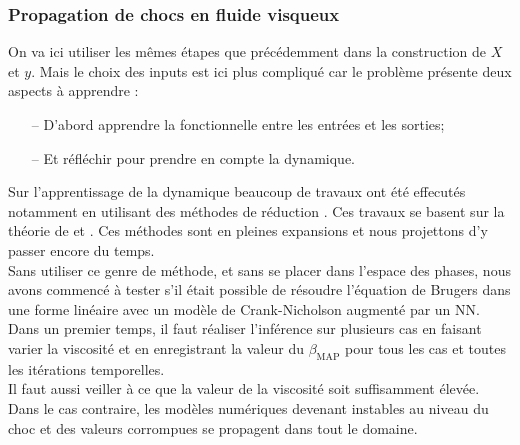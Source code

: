 \documentclass[a4paper,12pt]{article}
\newcommand{\bmap}{\beta_{\text{MAP}}}
\newcommand\bk{\color{black}}
\newcommand\dsb{\color{dsb}}
\numberwithin{equation}{section} %
\begin{document}
\dsb \subsubsection{Propagation de chocs en fluide visqueux} \bk \label{burgerBIF}
\noindent On va ici utiliser les mêmes étapes que précédemment dans la construction de $X$ et $y$. Mais le choix des inputs est ici plus compliqué car le problème présente deux aspects à apprendre : 
\begin{itemize}[leftmargin=5mm]
\item[--] D'abord apprendre la fonctionnelle entre les entrées et les sorties;
\item[--] Et réfléchir pour prendre en compte la dynamique.
\end{itemize}   
Sur l'apprentissage de la dynamique beaucoup de travaux ont été effecutés notamment en utilisant des méthodes de réduction \citep{parish2016reduced}. Ces travaux se basent sur la théorie de \citep{chorin2002optimal} et \citep{tsung1995phase}. Ces méthodes sont en pleines expansions et nous projettons d'y passer encore du temps.\\
\noindent Sans utiliser ce genre de méthode, et sans se placer dans l'espace des phases, nous avons commencé à tester s'il était possible de résoudre l'équation de Brugers dans une forme linéaire avec un modèle de Crank-Nicholson augmenté par un NN.\\
Dans un premier temps, il faut réaliser l'inférence sur plusieurs cas en faisant varier la viscosité et en enregistrant la valeur du $\bmap$ pour tous les cas et toutes les itérations temporelles. \\
Il faut aussi veiller à ce que la valeur de la viscosité soit suffisamment élevée. Dans le cas contraire, les modèles numériques devenant instables au niveau du choc et des valeurs corrompues se propagent dans tout le domaine.\\
\end{document}
